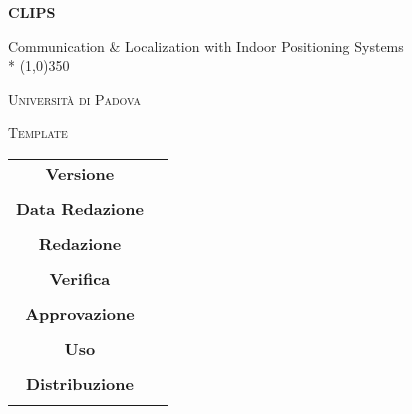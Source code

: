 \documentclass[a4paper,12pt]{article}
\author{Nome Autore}
\date{05/01/2016}
\begin{document}
\begin{titlepage}
	\centering
	{\huge\bfseries CLIPS\par}
	Communication \& Localization with Indoor Positioning Systems \\*
	\line(1,0){350} \\
	{\scshape\LARGE Università di Padova \par}
	\vspace{1cm}
	{\scshape\Large Template \par}
	\logo
	\newpage
	\begin{tabular}{c|c}
		{\hfill \textbf{Versione}} 			& 					\\ \\
		{\hfill\textbf{Data Redazione}} 	&            		\\ \\
		{\hfill\textbf{Redazione}} 			&  					\\ \\
		{\hfill\textbf{Verifica}} 			&  					\\ \\
		{\hfill\textbf{Approvazione}} 		&  					\\ \\
		{\hfill\textbf{Uso}} 				& 					\\ \\
		{\hfill\textbf{Distribuzione}} 		& 					\\ \\
	\end{tabular}
\end{titlepage}
	
	\newpage

	\tableofcontents
	
	\label{LastFrontPage}
	

	\newpage
	
	\pagestyle{mymain}
	
	 \newpage
		

	\newpage
		
	
	\newpage
		
	
	\newpage
		

	
	\newpage
		

	\newpage
		
	
	\newpage
		
	
	\newpage
		

		
	\label{LastPage}
\end{document}
